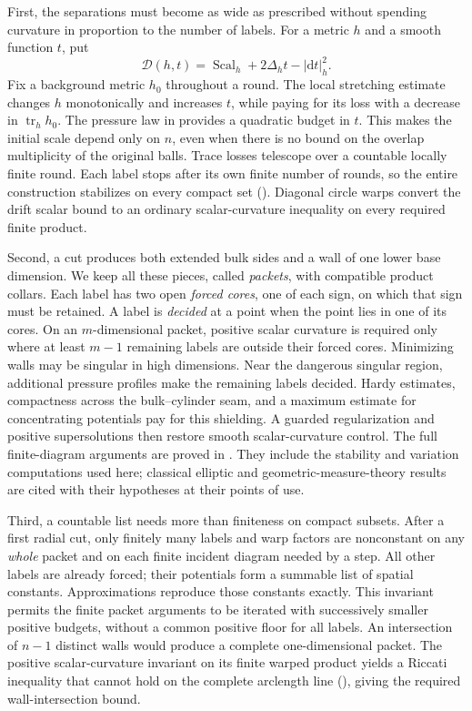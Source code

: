 \documentclass[11pt]{article}
\numberwithin{equation}{section}
\theoremstyle{definition}
\theoremstyle{remark}
\begin{document}
First, the separations must become as wide as prescribed without
spending curvature in proportion to the number of labels. For a metric
\(h\) and a smooth function \(t\), put
\begin{equation}\label{intro:drift-scalar}
 \mathcal D(h,t)=\operatorname{Scal}_h+2\Delta_h t-|\mathrm d t|_h^2.
\end{equation}
Fix a background metric \(h_0\) throughout a round. The local stretching
estimate changes \(h\) monotonically and increases \(t\), while paying
for its loss with a decrease in \(\operatorname{tr}_h h_0\).
The pressure law in  provides a quadratic budget in
\(t\). This makes the initial scale depend only on \(n\), even when
there is no bound on the overlap multiplicity of the original balls.
Trace losses telescope over a countable locally finite round. Each
label stops after its own finite number of rounds, so the entire
construction stabilizes on every compact set
(). Diagonal circle warps convert the drift scalar
bound to an ordinary scalar-curvature inequality on every required
finite product.

Second, a cut produces both extended bulk sides and a wall of one lower
base dimension. We keep all these pieces, called \emph{packets}, with
compatible product collars. Each label has two open \emph{forced cores},
one of each sign, on which that sign must be retained. A label is
\emph{decided} at a point when the point lies in one of its cores.
On an \(m\)-dimensional packet, positive
scalar curvature is required only where at least \(m-1\) remaining
labels are outside their forced cores. Minimizing walls may be
singular in high dimensions. Near the dangerous singular region,
additional pressure profiles make the remaining labels decided.
Hardy estimates, compactness across the bulk--cylinder seam, and a
maximum estimate for concentrating potentials pay for this shielding.
A guarded regularization and positive supersolutions then restore
smooth scalar-curvature control. The full finite-diagram arguments are
proved in .
They include the stability and variation computations used here;
classical elliptic and geometric-measure-theory results are cited with
their hypotheses at their points of use.

Third, a countable list needs more than finiteness on compact subsets.
After a first radial cut, only finitely many labels and warp factors
are nonconstant on any \emph{whole} packet and on each finite incident
diagram needed by a step. All other labels are already forced; their
potentials form a summable list of spatial constants. Approximations
reproduce those constants exactly. This invariant permits the finite
packet arguments to be iterated with successively smaller positive
budgets, without a common positive floor for all labels. An intersection
of \(n-1\) distinct walls would produce a complete one-dimensional
packet. The positive scalar-curvature invariant on its finite warped
product yields a Riccati inequality that cannot hold on the complete
arclength line (), giving the required
wall-intersection bound.
\end{document}
